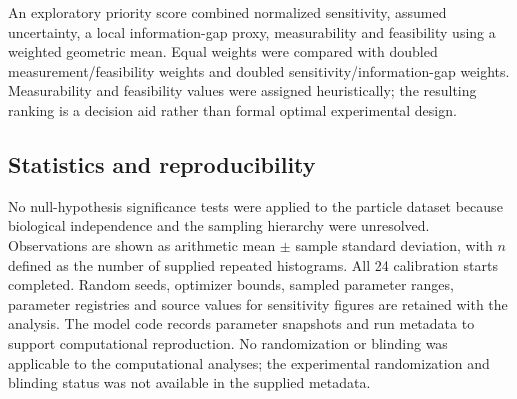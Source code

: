 An exploratory priority score combined normalized sensitivity, assumed uncertainty, a local information-gap proxy, measurability and feasibility using a weighted geometric mean. Equal weights were compared with doubled measurement/feasibility weights and doubled sensitivity/information-gap weights. Measurability and feasibility values were assigned heuristically; the resulting ranking is a decision aid rather than formal optimal experimental design.

\subsection*{Statistics and reproducibility}

No null-hypothesis significance tests were applied to the particle dataset because biological independence and the sampling hierarchy were unresolved. Observations are shown as arithmetic mean $\pm$ sample standard deviation, with $n$ defined as the number of supplied repeated histograms. All 24 calibration starts completed. Random seeds, optimizer bounds, sampled parameter ranges, parameter registries and source values for sensitivity figures are retained with the analysis. The model code records parameter snapshots and run metadata to support computational reproduction. No randomization or blinding was applicable to the computational analyses; the experimental randomization and blinding status was not available in the supplied metadata.
